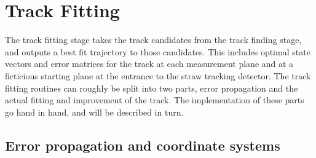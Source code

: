 




\section{Track Fitting}
\label{sec:TrackFitting}


The track fitting stage takes the track candidates from the track finding stage, and outputs a best fit trajectory to those candidates. This includes optimal state vectors and error matrices for the track at each measurement plane and at a ficticious starting plane at the entrance to the straw tracking detector. The track fitting routines can roughly be split into two parts, error propagation and the actual fitting and improvement of the track. The implementation of these parts go hand in hand, and will be described in turn. 


\subsection{Error propagation and coordinate systems}
\label{sub:Geane}

